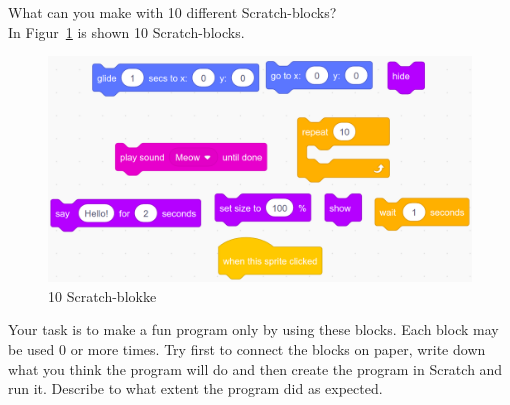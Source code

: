 What can you make with 10 different Scratch-blocks?\\
In Figur~\ref{fig:blokke} is shown 10 Scratch-blocks.
\begin{figure}
  \centering
  \includegraphics[width=0.9\linewidth]{figures/Scratch3.png}
  \caption{10 Scratch-blokke}
  \label{fig:blokke}
\end{figure}
Your task is to make a fun program only by using these blocks. Each
block may be used 0 or more times. Try first to connect the blocks on
paper, write down what you think the program will do and then create the
program in Scratch and run it. Describe to what extent the
program did as expected.
